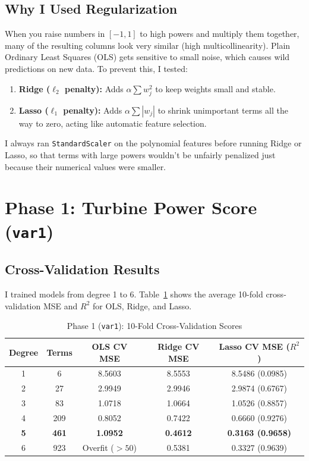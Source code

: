 \documentclass[11pt]{article}
\begin{document}
\subsection{Why I Used Regularization}
When you raise numbers in $[-1, 1]$ to high powers and multiply them together, many of the resulting columns look very similar (high multicollinearity). Plain Ordinary Least Squares (OLS) gets sensitive to small noise, which causes wild predictions on new data.
To prevent this, I tested:
\begin{enumerate}\itemsep 0pt
    \item \textbf{Ridge ($\ell_2$ penalty):} Adds $\alpha \sum w_j^2$ to keep weights small and stable.
    \item \textbf{Lasso ($\ell_1$ penalty):} Adds $\alpha \sum |w_j|$ to shrink unimportant terms all the way to zero, acting like automatic feature selection.
\end{enumerate}
I always ran \texttt{StandardScaler} on the polynomial features before running Ridge or Lasso, so that terms with large powers wouldn't be unfairly penalized just because their numerical values were smaller.

\section{Phase 1: Turbine Power Score (\texttt{var1})}

\subsection{Cross-Validation Results}
I trained models from degree 1 to 6. Table~\ref{tab:var1} shows the average 10-fold cross-validation MSE and $R^2$ for OLS, Ridge, and Lasso.

\begin{table}[htbp]
\centering
\caption{Phase 1 (\texttt{var1}): 10-Fold Cross-Validation Scores}
\label{tab:var1}
\small
\begin{tabular}{ccccc}
\toprule
\textbf{Degree} & \textbf{Terms} & \textbf{OLS CV MSE} & \textbf{Ridge CV MSE} & \textbf{Lasso CV MSE ($R^2$)} \\
\midrule
1 & 6   & 8.5603 & 8.5553 & 8.5486 (0.0985) \\
2 & 27  & 2.9949 & 2.9946 & 2.9874 (0.6767) \\
3 & 83  & 1.0718 & 1.0664 & 1.0526 (0.8857) \\
4 & 209 & 0.8052 & 0.7422 & 0.6660 (0.9276) \\
\textbf{5} & \textbf{461} & \textbf{1.0952} & \textbf{0.4612} & \textbf{0.3163 (0.9658)} \\
6 & 923 & Overfit ($>50$) & 0.5381 & 0.3327 (0.9639) \\
\bottomrule
\end{tabular}
\end{table}
\end{document}
